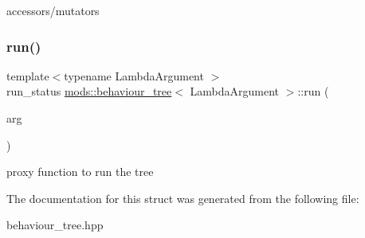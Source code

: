 accessors/mutators \mbox{\label{structmods_1_1behaviour__tree_a16325f964dcd87f8f59202bb8cde5a6d}} 
\subsubsection{\texorpdfstring{run()}{run()}}
{\footnotesize\ttfamily template$<$typename Lambda\+Argument $>$ \\
run\+\_\+status \hyperlink{structmods_1_1behaviour__tree}{mods\+::behaviour\+\_\+tree}$<$ Lambda\+Argument $>$\+::run (\begin{DoxyParamCaption}\item[{Lambda\+Argument}]{arg }\end{DoxyParamCaption})\hspace{0.3cm}{\ttfamily [inline]}}

proxy function to run the tree 

The documentation for this struct was generated from the following file\+:\begin{DoxyCompactItemize}
\item 
behaviour\+\_\+tree.\+hpp\end{DoxyCompactItemize}
